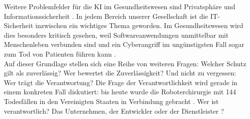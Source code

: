 Weitere Problemfelder für die KI im Gesundheitswesen sind Privatsphäre und Informationssicherheit \cite{Opportunities_challenges_ai_hc}. In jedem Bereich unserer Gesellschaft ist die IT-Sicherheit inzwischen ein wichtiges Thema geworden. Im Gesundheitswesen wird dies besonders kritisch gesehen, weil Softwareanwendungen unmittelbar mit Menschenleben verbunden sind und ein Cyberangriff im ungünstigsten Fall sogar zum Tod von Patienten führen kann \cite{Opportunities_challenges_ai_hc}.\\
Auf dieser Grundlage stellen sich eine Reihe von weiteren Fragen: Welcher Schutz gilt als zuverlässig? Wer bewertet die Zuverlässigkeit? Und nicht zu vergessen: Wer trägt die Verantwortung? 
Die Frage der Verantwortlichkeit wird gerade in einem konkreten Fall diskutiert: bis heute wurde die Roboterchirurgie mit 144 Todesfällen in den Vereinigten Staaten in Verbindung gebracht \cite{Chapter_14}. Wer ist verantwortlich? Das Unternehmen, der Entwickler oder der Dienstleister \cite{Chapter_14}?
